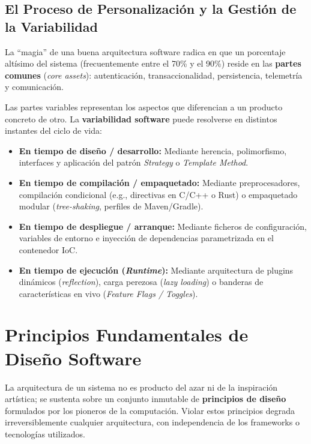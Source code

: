 \subsection{El Proceso de Personalización y la Gestión de la Variabilidad}

La ``magia'' de una buena arquitectura software radica en que un porcentaje altísimo del sistema (frecuentemente entre el 70\% y el 90\%) reside en las \textbf{partes comunes} (\emph{core assets}): autenticación, transaccionalidad, persistencia, telemetría y comunicación.

Las partes variables representan los aspectos que diferencian a un producto concreto de otro. La \textbf{variabilidad software} puede resolverse en distintos instantes del ciclo de vida:
\begin{itemize}[leftmargin=1.5em]
  \item \textbf{En tiempo de diseño / desarrollo:} Mediante herencia, polimorfismo, interfaces y aplicación del patrón \emph{Strategy} o \emph{Template Method}.
  \item \textbf{En tiempo de compilación / empaquetado:} Mediante preprocesadores, compilación condicional (e.g., directivas en C/C++ o Rust) o empaquetado modular (\emph{tree-shaking}, perfiles de Maven/Gradle).
  \item \textbf{En tiempo de despliegue / arranque:} Mediante ficheros de configuración, variables de entorno e inyección de dependencias parametrizada en el contenedor IoC.
  \item \textbf{En tiempo de ejecución (\emph{Runtime}):} Mediante arquitectura de plugins dinámicos (\emph{reflection}), carga perezosa (\emph{lazy loading}) o banderas de características en vivo (\emph{Feature Flags / Toggles}).
\end{itemize}

\section{Principios Fundamentales de Diseño Software}
\label{sec:principios-diseno}

La arquitectura de un sistema no es producto del azar ni de la inspiración artística; se sustenta sobre un conjunto inmutable de \textbf{principios de diseño} formulados por los pioneros de la computación. Violar estos principios degrada irreversiblemente cualquier arquitectura, con independencia de los frameworks o tecnologías utilizados.

